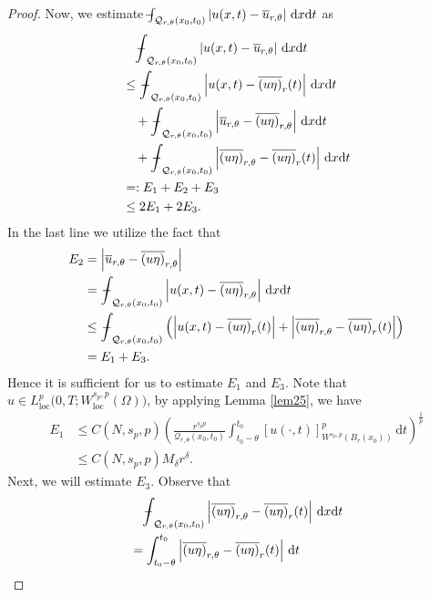 \documentclass[reqno,10pt]{amsart}
\numberwithin{equation}{section}
\newcommand{ \mint }{ {\int\hspace{-0.38cm}-}}
\begin{document}
\begin{proof}
	Now, we estimate $\mint_{\mathcal{Q}_{r,\theta}(x_0,t_0)}\left|u(x,t)-\overline{u}_{r,\theta}\right|\,\mathrm{d}x\mathrm{d}t$ as
	\begin{align}
		\label{26.1}
		&\quad\mint_{\mathcal{Q}_{r,\theta}(x_0,t_0)}\left|u(x,t)-\overline{u}_{r,\theta}\right|\,\mathrm{d}x\mathrm{d}t\nonumber\\
		&\le\mint_{\mathcal{Q}_{r,\theta}(x_0,t_0)}\left|u(x,t)-\overline{(u\eta)}_{r}(t)\right|\,\mathrm{d}x\mathrm{d}t\nonumber\\
		&\quad+\mint_{\mathcal{Q}_{r,\theta}(x_0,t_0)}\left|\overline{u}_{r,\theta}-\overline{(u\eta)}_{r,\theta}\right|\,\mathrm{d}x\mathrm{d}t\nonumber\\
		&\quad+\mint_{\mathcal{Q}_{r,\theta}(x_0,t_0)}\left|\overline{(u\eta)}_{r,\theta}-\overline{(u\eta)}_{r}(t)\right|\,\mathrm{d}x\mathrm{d}t\nonumber\\
		&=:E_1+E_2+E_3\nonumber\\
		&\le 2E_1+2E_3.
	\end{align}
	In the last line we utilize the fact that
	\begin{align*}
		E_2&=\left|\overline{u}_{r,\theta}-\overline{(u\eta)}_{r,\theta}\right|\\
		&=\mint_{\mathcal{Q}_{r,\theta}(x_0,t_0)}\left|u(x,t)-\overline{(u\eta)}_{r,\theta}\right|\,\mathrm{d}x\mathrm{d}t\\
		&\le \mint_{\mathcal{Q}_{r,\theta}(x_0,t_0)}\left( \left| u(x,t)-\overline{(u\eta)}_{r}(t)\right|+\left|\overline{(u\eta)}_{r,\theta}-\overline{(u\eta)}_{r}(t)\right| \right)\\
		&=E_1+E_3.
	\end{align*}
	Hence it is sufficient for us to estimate $E_1$ and $E_3$. Note that $u\in L^p_{\mathrm{loc}}\bigl(0,T;W^{s_p,p}_{\mathrm{loc}}(\Omega)\bigl)$, by applying Lemma \ref{lem25}, we have
	\begin{align}
		\label{26.2}
		E_1&\le C(N,s_p,p)\left( \frac{r^{s_pp}}{\mathcal{Q}_{r,\theta}(x_0,t_0)}\int_{t_0-\theta}^{t_0}[u(\cdot,t)]^p_{W^{s_p,p}(B_r(x_0))}\,\mathrm{d}t\right)^\frac{1}{p}\nonumber\\
		&\le C(N,s_p,p)M_\delta r^\delta.
	\end{align} 
	Next, we will estimate $E_3$. Observe that
	\begin{align}
		\label{26.3}
		&\quad\mint_{\mathcal{Q}_{r,\theta}(x_0,t_0)}\left|\overline{(u\eta)}_{r,\theta}-\overline{(u\eta)}_{r}(t)\right|\,\mathrm{d}x\mathrm{d}t\nonumber\\
		&=\int_{t_0-\theta}^{t_0}\left|\overline{(u\eta)}_{r,\theta}-\overline{(u\eta)}_{r}(t)\right|\,\mathrm{d}t\nonumber\\

\end{align}
\end{proof}
\end{document}
